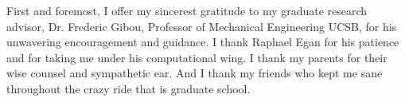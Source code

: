 \begin{acknowledgements}

First and foremost, I offer my sincerest gratitude to my graduate research advisor, Dr. Frederic Gibou, Professor of Mechanical Engineering UCSB, for his unwavering encouragement and guidance. I thank Raphael Egan for his patience and for taking me under his computational wing. I thank my parents for their wise counsel and sympathetic ear. And I thank my friends who kept me sane throughout the crazy ride that is graduate school. 

\end{acknowledgements} 